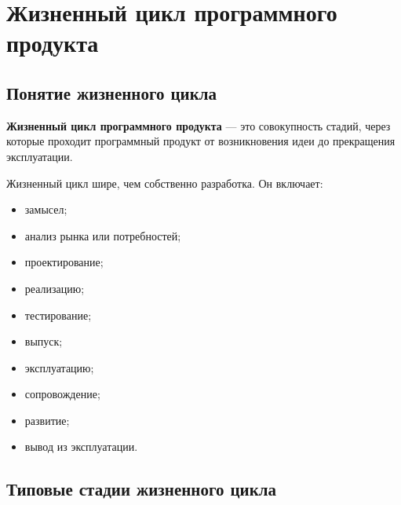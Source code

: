 \documentclass[12pt,a4paper]{article}
\begin{document}
\section{Жизненный цикл программного продукта}

\subsection{Понятие жизненного цикла}

\textbf{Жизненный цикл программного продукта} --- это совокупность стадий, через которые проходит программный продукт от возникновения идеи до прекращения эксплуатации.

Жизненный цикл шире, чем собственно разработка. Он включает:
\begin{itemize}
    \item замысел;
    \item анализ рынка или потребностей;
    \item проектирование;
    \item реализацию;
    \item тестирование;
    \item выпуск;
    \item эксплуатацию;
    \item сопровождение;
    \item развитие;
    \item вывод из эксплуатации.
\end{itemize}

\subsection{Типовые стадии жизненного цикла}
\end{document}
